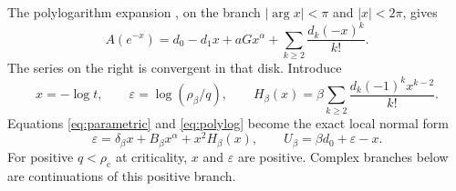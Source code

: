 \documentclass[11pt,a4paper]{article}
\numberwithin{equation}{section}
\theoremstyle{definition}
\theoremstyle{remark}
\newcommand{\rhoc}{\rho_{\mathrm c}}
\begin{document}
The polylogarithm expansion \cite[Eq.~25.12.12]{dlmf}, on the branch
$|\arg x|<\pi$ and $|x|<2\pi$, gives
\begin{equation}\label{eq:polylog}
 A(e^{-x})=d_0-d_1x+aGx^\alpha
                  +\sum_{k\ge2}\frac{d_k(-x)^k}{k!}.
\end{equation}
The series on the right is convergent in that disk. Introduce
\begin{equation}\label{eq:critical-coordinate}
 x=-\log t,\qquad \varepsilon=\log(\rho_\beta/q),\qquad
 H_\beta(x)=\beta\sum_{k\ge2}\frac{d_k(-1)^k x^{k-2}}{k!}.
\end{equation}
Equations \eqref{eq:parametric} and \eqref{eq:polylog} become the exact
local normal form
\begin{equation}\label{eq:normalform}
 \boxed{\quad
 \varepsilon=\delta_\beta x+B_\beta x^\alpha+x^2H_\beta(x),
 \qquad U_\beta=\beta d_0+\varepsilon-x.\quad}
\end{equation}
For positive $q<\rhoc$ at criticality, $x$ and $\varepsilon$ are positive.
Complex branches below are continuations of this positive branch.
\end{document}
